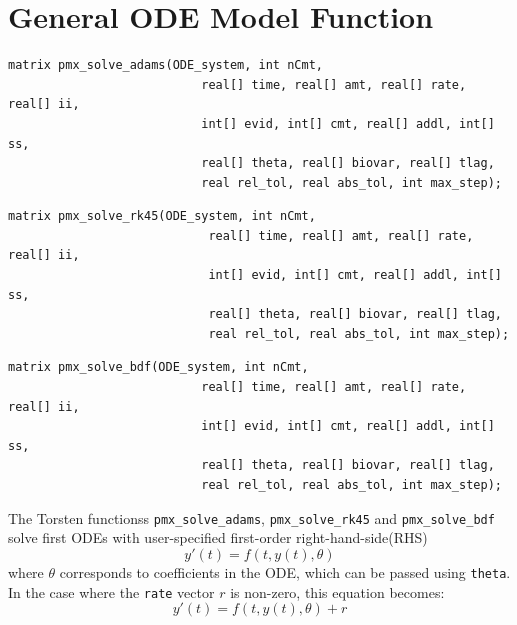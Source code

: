 \documentclass[11pt, reqno, oneside]{amsbook}
\numberwithin{equation}{chapter}
\numberwithin{figure}{chapter}
\numberwithin{table}{chapter}
\theoremstyle{remark}
\begin{document}
\section{General ODE Model Function}
\label{sec:org86fa1e5}
\begin{verbatim}
matrix pmx_solve_adams(ODE_system, int nCmt,
                           real[] time, real[] amt, real[] rate, real[] ii,
                           int[] evid, int[] cmt, real[] addl, int[] ss,
                           real[] theta, real[] biovar, real[] tlag,                      
                           real rel_tol, real abs_tol, int max_step);
\end{verbatim}
\begin{verbatim}
matrix pmx_solve_rk45(ODE_system, int nCmt,
                            real[] time, real[] amt, real[] rate, real[] ii,
                            int[] evid, int[] cmt, real[] addl, int[] ss,
                            real[] theta, real[] biovar, real[] tlag,                      
                            real rel_tol, real abs_tol, int max_step);
\end{verbatim}
\begin{verbatim}
matrix pmx_solve_bdf(ODE_system, int nCmt,
                           real[] time, real[] amt, real[] rate, real[] ii,
                           int[] evid, int[] cmt, real[] addl, int[] ss,
                           real[] theta, real[] biovar, real[] tlag,                      
                           real rel_tol, real abs_tol, int max_step);
\end{verbatim}

The Torsten functionss \texttt{pmx\_solve\_adams}, \texttt{pmx\_solve\_rk45} and
\texttt{pmx\_solve\_bdf} solve first ODEs with
user-specified first-order right-hand-side(RHS)
\begin{equation*}
y'(t) = f(t, y(t), \theta)
\end{equation*}
%
where $\theta$ corresponds to coefficients in the ODE, which can be passed using \texttt{theta}.
In the case where the \texttt{rate} vector \(r\) is non-zero, this equation becomes:
\begin{equation*}
y'(t) = f(t, y(t), \theta) + r
\end{equation*}
\end{document}
